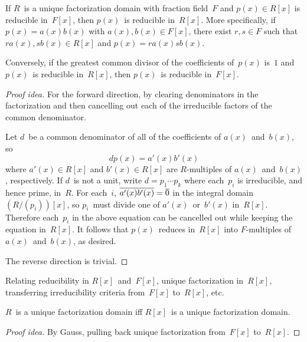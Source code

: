 \begin{thm}[Gauss]
If \(R\)~is a unique factorization domain with fraction field~\(F\) and \(p(x)\in R[x]\) is reducible in~\(F[x]\), then \(p(x)\)~is reducible in~\(R[x]\). More specifically, if \(p(x)=a(x)b(x)\) with \(a(x),b(x)\in F[x]\), there exist \(r,s\in F\) such that \(ra(x),sb(x)\in R[x]\) and \(p(x)=ra(x)sb(x)\).

Conversely, if the greatest common divisor of the coefficients of~\(p(x)\) is~\(1\) and \(p(x)\)~is reducible in~\(R[x]\), then \(p(x)\)~is reducible in~\(F[x]\).
\end{thm}
\begin{proof}[Proof idea]
For the forward direction, by clearing denominators in the factorization and then cancelling out each of the irreducible factors of the common denominator.

Let \(d\)~be a common denominator of all of the coefficients of \(a(x)\)~and~\(b(x)\), so
\[dp(x)=a'(x)b'(x)\]
where \(a'(x)\in R[x]\) and \(b'(x)\in R[x]\) are \(R\)-multiples of \(a(x)\)~and~\(b(x)\), respectively. If \(d\)~is not a unit, write \(d=p_1\cdots p_k\) where each~\(p_i\) is irreducible, and hence prime, in~\(R\). For each~\(i\), \(\overline{a'(x)b'(x)}=\overline{0}\) in the integral domain \((R/(p_i))[x]\), so \(p_i\)~must divide one of \(a'(x)\)~or~\(b'(x)\) in~\(R[x]\). Therefore each~\(p_i\) in the above equation can be cancelled out while keeping the equation in~\(R[x]\). It follows that \(p(x)\)~reduces in~\(R[x]\) into \(F\)-multiples of \(a(x)\)~and~\(b(x)\), as desired.

The reverse direction is trivial.
\end{proof}
\begin{app}
Relating reducibility in \(R[x]\)~and~\(F[x]\), unique factorization in~\(R[x]\), transferring irreducibility criteria from~\(F[x]\) to~\(R[x]\), etc.
\end{app}

\begin{cor}
\(R\)~is a unique factorization domain iff \(R[x]\)~is a unique factorization domain.
\end{cor}
\begin{proof}[Proof idea]
By Gauss, pulling back unique factorization from~\(F[x]\) to~\(R[x]\).
\end{proof}

